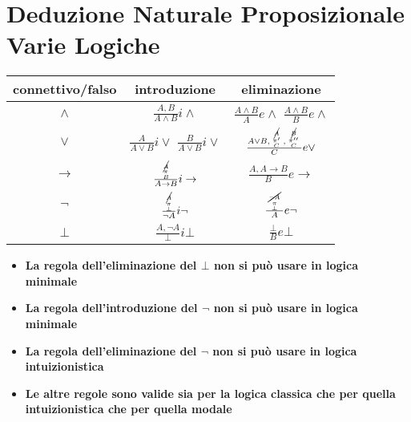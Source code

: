 \documentclass[a4paper,12pt, oneside]{book}
\newcommand*{\bfrac}[2]{\genfrac{}{}{0pt}{}{#1}{#2}}
\begin{document}
\section*{Deduzione Naturale Proposizionale Varie Logiche}
\begin{table}[H]
  \Large
  \centering
  \begin{tabular}{c||c|c}
    connettivo/falso& introduzione & eliminazione\\
    \hline
    \hline
    $\land$ & $\frac{A,B}{A\land B}i\land$&$\frac{A\land B}{A}e\land$
                                            $\frac{A\land B}{B}e\land$\\
    \hline
    $\lor$ &$\frac{A}{A\lor B}i\lor$
             $\frac{B}{A\lor B}i\lor$&$\frac{A\lor B,
                                       \bfrac{\bfrac{\cancel{A}}{\pi'}}{C},
                                       \bfrac{\bfrac{\cancel{B}}{\pi''}}{C}}{C}
                                       e\lor$\\
    \hline
    $\to$ & $\frac{\bfrac{\cancel{A}}
            {\bfrac{\pi}{B}}}{A\to B}i\to$ & $\frac{A,A\to B}{B}e\to$\\
   
    \hline
    $\neg$ & $\frac{\bfrac{\bfrac{\cancel{A}}{\pi}}
             {\bot}}{\neg A}i\neg$& $\frac{\bfrac{\bfrac{\cancel{\neg A}}{\pi}}
             {\bot}}{ A}e\neg$\\
    \hline
    \hline
    $\bot$ & $\frac{A,\neg A}{\bot}i\bot$& $\frac{\bot}{B}e\bot$\\
  \end{tabular}
\end{table}
\begin{itemize}
  \item \textbf{La regola dell'eliminazione del $\bot$ non si può usare in
    logica minimale}
  \item \textbf{La regola dell'introduzione del $\neg$ non si può usare in
    logica minimale}
  \item \textbf{La regola dell'eliminazione del $\neg$ non si può usare in
    logica intuizionistica}
  \item \textbf{Le altre regole sono valide sia per la logica classica che per
    quella intuizionistica che per quella modale}
\end{itemize}
\end{document}
